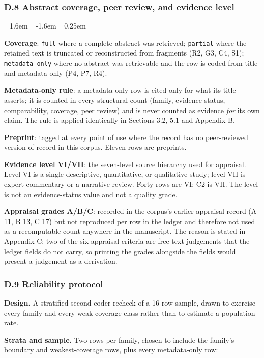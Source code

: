 \documentclass[11pt]{article}
\begin{document}
\subsubsection*{D.8 Abstract coverage, peer review, and evidence level}
\begin{list}{}{\leftmargin=1.6em \itemindent=-1.6em \itemsep=0.25em}
\item \textbf{Coverage}: \texttt{full} where a complete abstract was retrieved; \texttt{partial} where the retained text is truncated or reconstructed from fragments (R2, G3, C4, S1); \texttt{metadata-only} where no abstract was retrievable and the row is coded from title and metadata only (P4, P7, R4).
\item \textbf{Metadata-only rule}: a metadata-only row is cited only for what its title asserts; it is counted in every structural count (family, evidence status, comparability, coverage, peer review) and is never counted as evidence \textit{for} its own claim. The rule is applied identically in Sections 3.2, 5.1 and Appendix B.
\item \textbf{Preprint}: tagged at every point of use where the record has no peer-reviewed version of record in this corpus. Eleven rows are preprints.
\item \textbf{Evidence level VI/VII}: the seven-level source hierarchy used for appraisal. Level VI is a single descriptive, quantitative, or qualitative study; level VII is expert commentary or a narrative review. Forty rows are VI; C2 is VII. The level is not an evidence-status value and not a quality grade.
\item \textbf{Appraisal grades A/B/C}: recorded in the corpus's earlier appraisal record (A 11, B 13, C 17) but not reproduced per row in the ledger and therefore not used as a recomputable count anywhere in the manuscript. The reason is stated in Appendix C: two of the six appraisal criteria are free-text judgements that the ledger fields do not carry, so printing the grades alongside the fields would present a judgement as a derivation.
\end{list}
\subsubsection*{D.9 Reliability protocol}
\textbf{Design.} A stratified second-coder recheck of a 16-row sample, drawn to exercise every family and every weak-coverage class rather than to estimate a population rate.

\textbf{Strata and sample.} Two rows per family, chosen to include the family's boundary and weakest-coverage rows, plus every metadata-only row:
\end{document}
